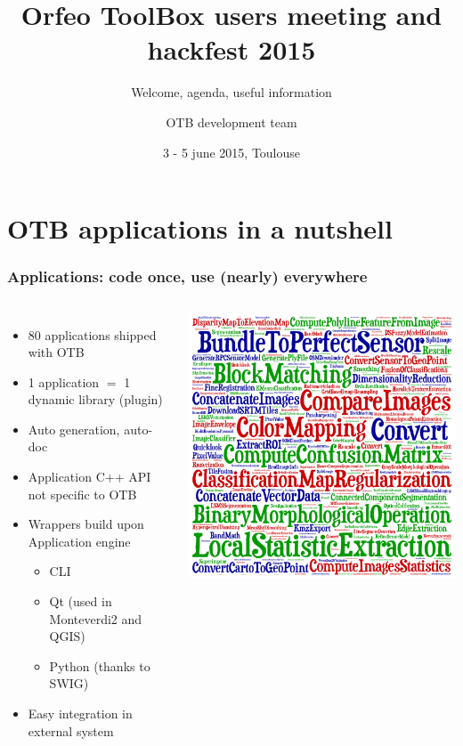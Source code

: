 \documentclass[8pt]{beamer}
\title{Orfeo ToolBox users meeting and hackfest 2015}
\subtitle{Welcome, agenda, useful information}
\author{OTB development team}%
\date{3 - 5 june 2015, Toulouse}
\begin{document}
\begin{frame}
\titlepage
\end{frame}

\section{OTB applications in a nutshell}

\begin{frame}
\frametitle{Applications: code once, use (nearly) everywhere}
\begin{columns}
\begin{itemize}
\item 80 applications shipped with OTB
\item 1 application $=$ 1 dynamic library (plugin)
\item Auto generation, auto-doc
\item Application C++ API not specific to OTB
\item Wrappers build upon Application engine
\begin{itemize}
  \item CLI
  \item Qt (used in Monteverdi2 and QGIS)
  \item Python (thanks to SWIG)
\end{itemize}
\item Easy integration in external system 
\end{itemize}
\includegraphics[width=\textwidth]{images/cloud_applications.png}
\end{columns}
\end{frame}
\end{document}
